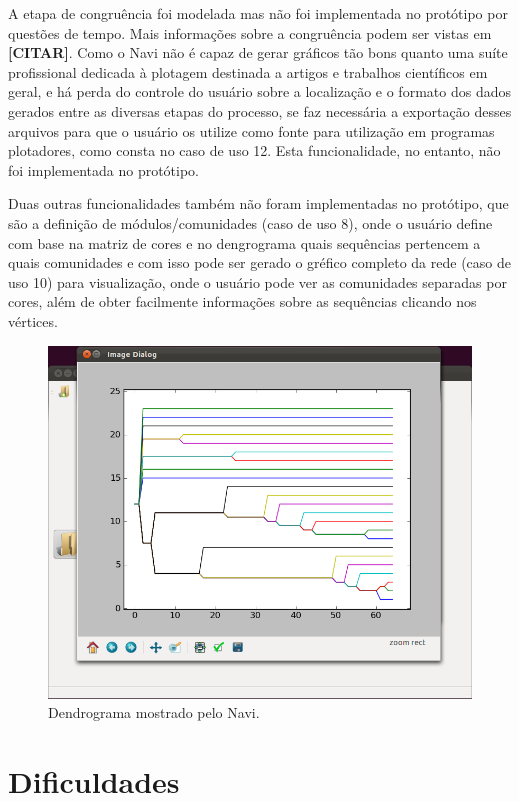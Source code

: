 A etapa de congruência foi modelada mas não foi implementada no protótipo por questões de tempo. Mais informações sobre a congruência podem
ser vistas em \textbf{[CITAR]}. Como o Navi não é capaz de gerar gráficos tão bons quanto uma suíte profissional dedicada à plotagem destinada a artigos e
trabalhos científicos em geral, e há perda do controle do usuário sobre a localização e o formato dos dados gerados entre as diversas etapas do processo, se
faz necessária a exportação desses arquivos para que o usuário os utilize como fonte para utilização em programas plotadores, como consta no caso de uso
12. Esta funcionalidade, no entanto, não foi implementada no protótipo.

Duas outras funcionalidades também não foram implementadas no protótipo, que são a definição de módulos/comunidades (caso de uso 8), onde o usuário define
com base na matriz de cores e no dengrograma quais sequências pertencem a quais comunidades e com isso pode ser gerado o gréfico completo da rede (caso de
uso 10) para visualização, onde o usuário pode ver as comunidades separadas por cores, além de obter facilmente informações sobre as sequências clicando nos
vértices.

\begin{figure}
\centering
\includegraphics[scale=0.38]{navi-dendrogram}
\caption{Dendrograma mostrado pelo Navi.}
\label{fig:navi-dendrogram}
\end{figure}

\section{Dificuldades} \label{sec:dificuldades}

